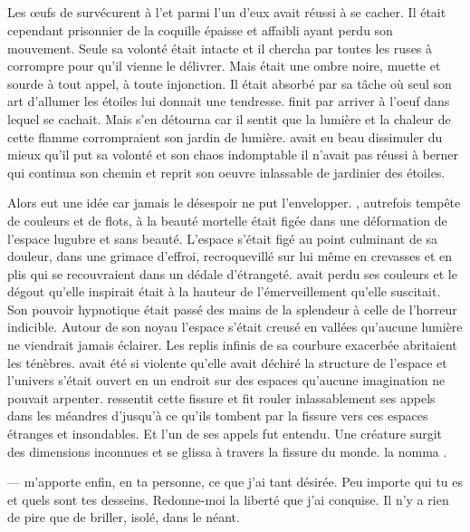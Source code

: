 \subsection{\Ogo}

Les œufs de \Tot survécurent à l'\Extinction et parmi l'un d'eux \Ogo avait réussi à se cacher. Il était cependant prisonnier de la coquille épaisse et affaibli ayant perdu son mouvement. Seule sa volonté était intacte et il chercha par toutes les ruses à corrompre \carac pour qu'il vienne le délivrer. Mais \carac était une ombre noire, muette et sourde à tout appel, à toute injonction. Il était absorbé par sa tâche où seul son art d'allumer les étoiles lui donnait une tendresse. \carac finit par arriver à l'oeuf dans lequel \Ogo se cachait. Mais \carac s'en détourna car il sentit que la lumière et la chaleur de cette flamme corrompraient son jardin de lumière. \Ogo avait eu beau dissimuler du mieux qu'il put sa volonté et son chaos indomptable il n'avait pas réussi à berner \carac qui continua son chemin et reprit son oeuvre inlassable de jardinier des étoiles. 

Alors \Ogo eut une idée car jamais le désespoir ne put l'envelopper. \auga, autrefois tempête de couleurs et de flots, à la beauté mortelle était figée dans une déformation de l'espace lugubre et sans beauté. L'espace s'était figé au point culminant de sa douleur, dans une grimace d'effroi, recroquevillé sur lui même en crevasses et en plis qui se recouvraient dans un dédale d'étrangeté. \auga avait perdu ses couleurs et le dégout qu'elle inspirait était à la hauteur de l'émerveillement qu'elle suscitait. Son pouvoir hypnotique était passé des mains de la splendeur à celle de l'horreur indicible. Autour de son noyau l'espace s'était creusé en vallées qu'aucune lumière ne viendrait jamais éclairer. Les replis infinis de sa courbure exacerbée abritaient les ténèbres. \auga avait été si violente qu'elle avait déchiré la structure de l'espace et l'univers s'était ouvert en un endroit sur des espaces qu'aucune imagination ne pouvait arpenter. \Ogo ressentit cette fissure et fit rouler inlassablement ses appels dans les méandres d'\auga jusqu'à ce qu'ils tombent par la fissure vers ces espaces étranges et insondables. Et l'un de ses appels fut entendu. Une créature surgit des dimensions inconnues et se glissa à travers la fissure du monde. \Ogo la nomma \Shuru.

--- \auga m'apporte enfin, en ta personne, ce que j'ai tant désirée. Peu importe qui tu es et quels sont tes desseins. Redonne-moi la liberté que j'ai conquise. Il n'y a rien de pire que de briller, isolé, dans le néant. \n

